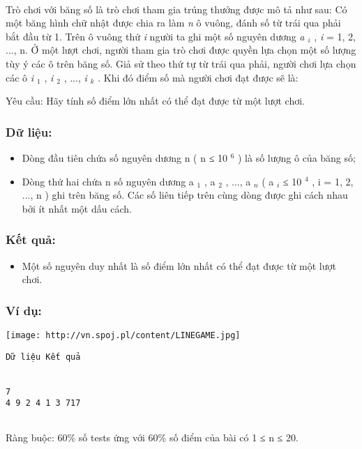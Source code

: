 

 

Trò chơi với băng số là trò chơi tham gia trúng thưởng được mô tả như sau: Có một băng hình chữ nhật được chia ra làm \emph{ n } ô vuông, đánh số từ trái qua phải bắt đầu từ 1. Trên ô vuông thứ \emph{ i } người ta ghi một số nguyên dương \emph{ a $_ i $} , \emph{ i } = 1, 2, ..., n. Ở một lượt chơi, người tham gia trò chơi được quyền lựa chọn một số lượng tùy ý các ô trên băng số. Giả sử theo thứ tự từ trái qua phải, người chơi lựa chọn các ô \emph{ i $_ 1 $} , \emph{ i $_ 2 $} , ..., \emph{ i $_ k $} . Khi đó điểm số mà người chơi đạt được sẽ là:

Yêu cầu: Hãy tính số điểm lớn nhất có thể đạt được từ một lượt chơi.

\subsubsection{Dữ liệu:}
\begin{itemize}
	\item Dòng đầu tiên chứa số nguyên dương n ( n ≤ 10 $^ 6 $ ) là số lượng ô của băng số;
	\item Dòng thứ hai chứa n số nguyên dương a $_ 1 $ , a $_ 2 $ , ..., a $_ n $ ( a $_ i $ ≤ 10 $^ 4 $ , i = 1, 2, ..., n ) ghi trên băng số. Các số liên tiếp trên cùng dòng được ghi cách nhau bởi ít nhất một dấu cách.
\end{itemize}

\subsubsection{Kết quả:}
\begin{itemize}
	\item Một số nguyên duy nhất là số điểm lớn nhất có thể đạt được từ một lượt chơi.
\end{itemize}

\subsubsection{Ví dụ:}


\texttt{[image: http://vn.spoj.pl/content/LINEGAME.jpg]}
\begin{verbatim}
Dữ liệu Kết quả


7
4 9 2 4 1 3 717


\end{verbatim}

Ràng buộc: 60\% số tests ứng với 60\% số điểm của bài có 1 ≤ n ≤ 20.